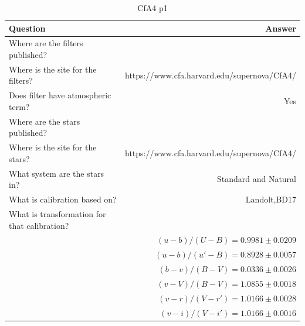 \documentclass[twocolumn]{aastex63}
\begin{document}
\begin{table}
\label{table:information}
\caption{\large CfA4 p1}
\begin{tabular}{lr}
\toprule
    Question & Answer \\
\hline

Where are the filters published? & \cite{CfA4_p1} \\
Where is the site for the filters? & https://www.cfa.harvard.edu/supernova/CfA4/ \\
Does filter have atmospheric term?	& Yes \\
Where are the stars published? & \cite{cfa4p1stars} \\
Where is the site for the stars? & https://www.cfa.harvard.edu/supernova/CfA4/ \\
What system are the stars in? & Standard and Natural \\
What is calibration based on? & Landolt,BD17 \\
What is transformation for that calibration? & ~\\
~& $(u-b)/(U-B) = 0.9981 \pm 0.0209$ \\
~ & $(u-b)/(u'-B) = 0.8928 \pm 0.0057$ \\
~ & $(b-v)/(B-V) = 0.0336 \pm 0.0026$ \\
~ & $(v-V)/(B-V) = 1.0855 \pm 0.0018$ \\
~ & $(v-r)/(V-r') = 1.0166 \pm 0.0028$ \\
~ & $(v-i)/(V-i') = 1.0166 \pm 0.0016$ \\
\end{tabular}
\end{table}
\end{document}
